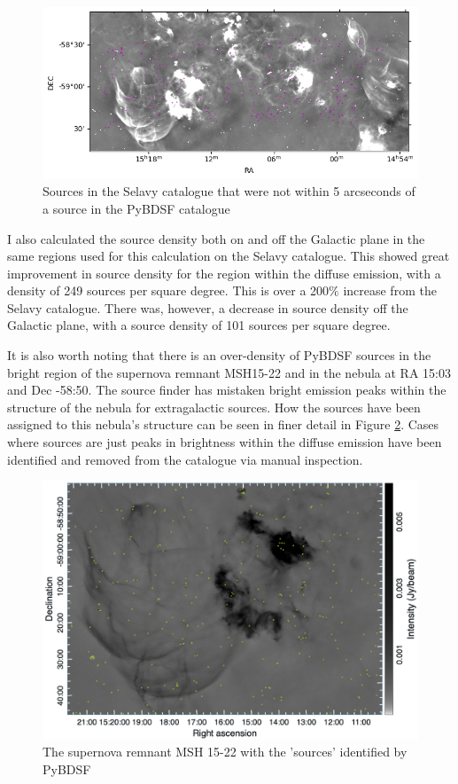 \begin{figure}
    \centering
    \includegraphics[width=\linewidth]{Thesis_Template/Figures/sel match.png}
    \caption[Selavy only sources]{Sources in the Selavy catalogue that were not within 5 arcseconds of a source in the PyBDSF catalogue}
    \label{fig: selavy not match}
\end{figure}

I also calculated the source density both on and off the Galactic plane in the same regions used for this calculation on the Selavy catalogue. This showed great improvement in source density for the region within the diffuse emission, with a density of 249 sources per square degree. This is over a 200$\%$ increase from the Selavy catalogue. There was, however, a decrease in source density off the Galactic plane, with a source density of 101 sources per square degree.

It is also worth noting that there is an over-density of PyBDSF sources in the bright region of the supernova remnant MSH15-22 and in the nebula at RA 15:03 and Dec -58:50. The source finder has mistaken bright emission peaks within the structure of the nebula for extragalactic sources. How the sources have been assigned to this nebula's structure can be seen in finer detail in Figure \ref{fig: snr sources}. Cases where sources are just peaks in brightness within the diffuse emission have been identified and removed from the catalogue via manual inspection.

\begin{figure}
    \centering
    \includegraphics[width=\linewidth]{Thesis_Template/Figures/EMU_1505-60_hi.fits-image-2025-04-24-17-41-48.png}
    \caption{The supernova remnant MSH 15-22 with the 'sources' identified by PyBDSF}
    \label{fig: snr sources}
\end{figure}

